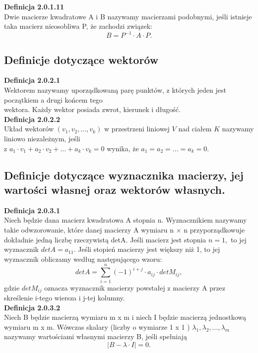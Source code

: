 \documentclass[10pt,a4paper]{report}
\begin{document}
\noindent \textbf{Definicja 2.0.1.11}\\
\noindent Dwie macierze kwadratowe A i B nazywamy macierzami podobnymi, jeśli istnieje taka macierz nieosobliwa P, że zachodzi związek: $$ B=P^{-1}\cdot A\cdot P. $$


\subsection{Definicje dotyczące wektorów} 

\noindent \textbf{Definicja 2.0.2.1}\\
\noindent Wektorem nazywamy uporządkowaną parę punktów, z których jeden jest początkiem a drugi końcem tego\\ wektora. Każdy wektor posiada zwrot, kierunek i długość.\\

\noindent \textbf{Definicja 2.0.2.2}\\
\noindent Układ wektorów  $ (v_{1}, v_{2}, ..., v_{k}) $ w przestrzeni liniowej $ V $ nad ciałem $ K $ nazywamy liniowo niezależnym, jeśli\\ z $ a_{1}\cdot v_{1}+ a_{2}\cdot v_{2} + ... + a_{k}\cdot v_{k} = 0 $ wynika, że $a_{1}=a_{2}=...=a_{k}=0 $.\\

\subsection{Definicje dotyczące wyznacznika macierzy, jej wartości własnej oraz wektorów własnych.}

\noindent \textbf{Definicja 2.0.3.1}\\
\noindent Niech będzie dana macierz kwadratowa A stopnia n. Wyznacznikiem nazywamy takie odwzorowanie, które danej macierzy A wymiaru n × n przyporządkowuje dokładnie jedną liczbę rzeczywistą detA. Jeśli macierz jest stopnia $n = 1, $ to jej wyznacznik $detA = a_{11}. $
Jeśli stopień macierzy jest większy niż 1, to jej wyznacznik obliczamy według następującego wzoru: 
$$detA = \sum_{i=1}^{n}(−1)^{i+j}\cdot a_{ij}\cdot detM_{ij}, $$
gdzie $detM_{ij}$ oznacza wyznacznik macierzy powstałej z macierzy A przez skreślenie i-tego wiersza i j-tej kolumny.\\
\newpage
\noindent \textbf{Definicja 2.0.3.2}\\
\noindent Niech B będzie macierzą wymiaru m x m i niech I będzie macierzą jednostkową wymiaru m x m. Wówczas skalary (liczby o wymiarze 1 x 1 ) $\lambda_{1}, \lambda_{2}, ..., \lambda_{m} $ nazywamy wartościami własnymi macierzy B, jeśli spełniają $$|B-\lambda\cdot I|=0. $$ \\
\end{document}

